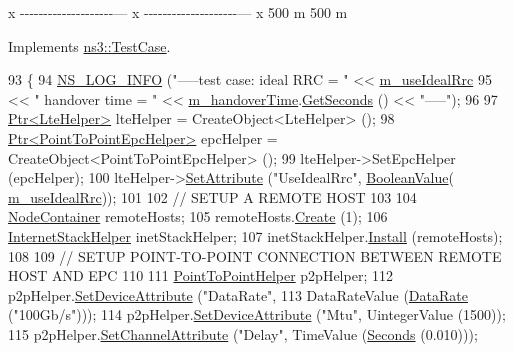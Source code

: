 x -\/-\/-\/-\/-\/-\/-\/-\/-\/-\/-\/-\/-\/-\/-\/-\/-\/-\/-\/-\/--- x -\/-\/-\/-\/-\/-\/-\/-\/-\/-\/-\/-\/-\/-\/-\/-\/-\/-\/-\/-\/--- x 500 m 500 m

Implements \hyperlink{classns3_1_1TestCase_a8ff74680cf017ed42011e4be51917a24}{ns3\+::\+Test\+Case}.


\begin{DoxyCode}
93 \{
94   \hyperlink{group__logging_gafbd73ee2cf9f26b319f49086d8e860fb}{NS\_LOG\_INFO} (\textcolor{stringliteral}{"-----test case: ideal RRC = "} << \hyperlink{classLteHandoverDelayTestCase_a30cdad0b440cb64618d4fcf28737dcc8}{m\_useIdealRrc}
95       << \textcolor{stringliteral}{" handover time = "} << \hyperlink{classLteHandoverDelayTestCase_a5dd216089c9a2cc3f0a65430b40233e9}{m\_handoverTime}.\hyperlink{classns3_1_1Time_a8f20d5c3b0902d7b4320982f340b57c8}{GetSeconds} () << \textcolor{stringliteral}{"-----"});
96 
97   \hyperlink{classns3_1_1Ptr}{Ptr<LteHelper>} lteHelper = CreateObject<LteHelper> ();
98   \hyperlink{classns3_1_1Ptr}{Ptr<PointToPointEpcHelper>} epcHelper = CreateObject<PointToPointEpcHelper> ();
99   lteHelper->SetEpcHelper (epcHelper);
100   lteHelper->\hyperlink{classns3_1_1ObjectBase_ac60245d3ea4123bbc9b1d391f1f6592f}{SetAttribute} (\textcolor{stringliteral}{"UseIdealRrc"}, \hyperlink{classns3_1_1BooleanValue}{BooleanValue}(
      \hyperlink{classLteHandoverDelayTestCase_a30cdad0b440cb64618d4fcf28737dcc8}{m\_useIdealRrc}));
101 
102   \textcolor{comment}{// SETUP A REMOTE HOST}
103 
104   \hyperlink{classns3_1_1NodeContainer}{NodeContainer} remoteHosts;
105   remoteHosts.\hyperlink{classns3_1_1NodeContainer_a787f059e2813e8b951cc6914d11dfe69}{Create} (1);
106   \hyperlink{classns3_1_1InternetStackHelper}{InternetStackHelper} inetStackHelper;
107   inetStackHelper.\hyperlink{classns3_1_1InternetStackHelper_a6645b412f31283d2d9bc3d8a95cebbc0}{Install} (remoteHosts);
108 
109   \textcolor{comment}{// SETUP POINT-TO-POINT CONNECTION BETWEEN REMOTE HOST AND EPC}
110 
111   \hyperlink{classns3_1_1PointToPointHelper}{PointToPointHelper} p2pHelper;
112   p2pHelper.\hyperlink{classns3_1_1PointToPointHelper_a4577f5ab8c387e5528af2e0fbab1152e}{SetDeviceAttribute} (\textcolor{stringliteral}{"DataRate"},
113       DataRateValue (\hyperlink{classns3_1_1DataRate}{DataRate} (\textcolor{stringliteral}{"100Gb/s"})));
114   p2pHelper.\hyperlink{classns3_1_1PointToPointHelper_a4577f5ab8c387e5528af2e0fbab1152e}{SetDeviceAttribute} (\textcolor{stringliteral}{"Mtu"}, UintegerValue (1500));
115   p2pHelper.\hyperlink{classns3_1_1PointToPointHelper_a6b5317fd17fb61e5a53f8d66a90b63b9}{SetChannelAttribute} (\textcolor{stringliteral}{"Delay"}, TimeValue (\hyperlink{group__timecivil_ga33c34b816f8ff6628e33d5c8e9713b9e}{Seconds} (0.010)));

\end{DoxyCode}
